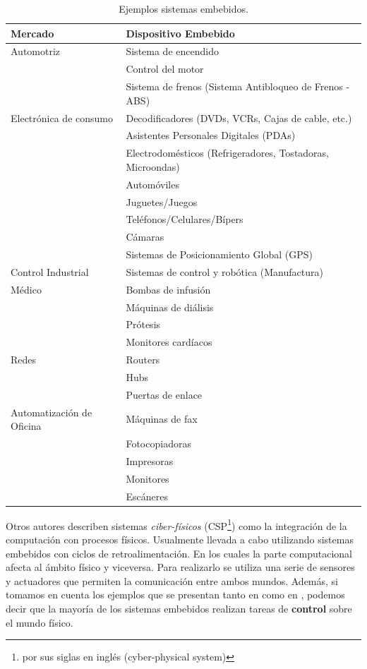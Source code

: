 \begin{table}[h]
\caption{Ejemplos sistemas embebidos.}
    \centering
    \label{tab:ejSistEmbebidos}
    \begin{tabular}{|l|l|}
        \hline
        \textbf{Mercado} & \textbf{Dispositivo Embebido} \\ \hline
        Automotriz & Sistema de encendido \\ 
        & Control del motor \\ 
        & Sistema de frenos (Sistema Antibloqueo de Frenos - ABS) \\ \hline
        Electrónica de consumo & Decodificadores (DVDs, VCRs, Cajas de cable, etc.) \\ 
        & Asistentes Personales Digitales (PDAs) \\ 
        & Electrodomésticos (Refrigeradores, Tostadoras, Microondas) \\ 
        & Automóviles \\ 
        & Juguetes/Juegos \\ 
        & Teléfonos/Celulares/Bípers \\ 
        & Cámaras \\ 
        & Sistemas de Posicionamiento Global (GPS) \\ \hline
        Control Industrial & Sistemas de control y robótica (Manufactura) \\ \hline
        Médico & Bombas de infusión \\ 
        & Máquinas de diálisis \\ 
        & Prótesis \\ 
        & Monitores cardíacos \\ \hline
        Redes & Routers \\ 
        & Hubs \\ 
        & Puertas de enlace \\ \hline
        Automatización de Oficina & Máquinas de fax \\ 
        & Fotocopiadoras \\ 
        & Impresoras \\ 
        & Monitores \\ 
        & Escáneres \\ \hline
    \end{tabular}
\end{table}

Otros autores \cite{lee2017introduction} describen sistemas \textit{ciber-físicos} (CSP\footnote{por sus siglas en inglés (cyber-physical system)}) como la integración de la computación con procesos físicos. Usualmente llevada a cabo utilizando sistemas embebidos con ciclos de retroalimentación. En los cuales la parte computacional afecta al ámbito físico y viceversa. Para realizarlo se utiliza una serie de sensores y actuadores que permiten la comunicación entre ambos mundos.
Además, si tomamos en cuenta los ejemplos que se presentan tanto en \cite{noergaard2005embedded} como en \cite{lee2017introduction}, podemos decir que la mayoría de los sistemas embebidos realizan tareas de \textbf{control} sobre el mundo físico.

